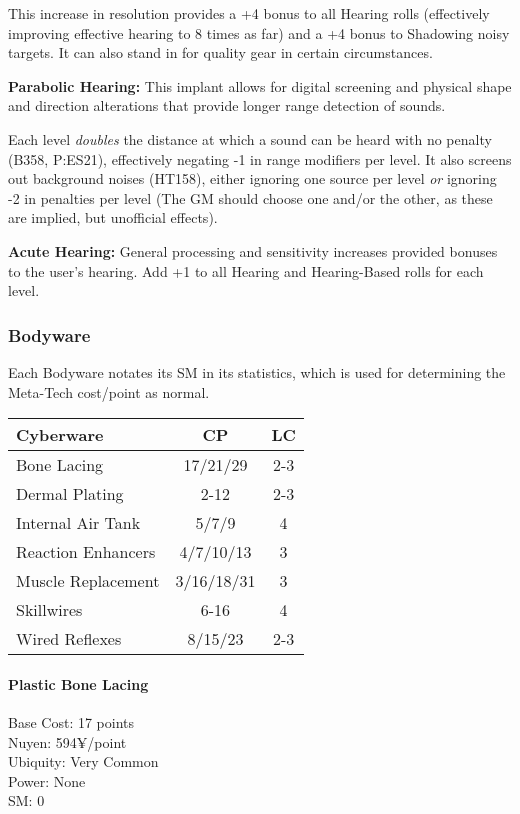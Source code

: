 \begin{multicols*}{3}
	This increase in resolution provides a +4 bonus to all Hearing rolls (effectively improving effective hearing to 8 times as far) and a +4 bonus to Shadowing noisy targets. It can also stand in for quality gear in certain circumstances.
	
	\textbf{Parabolic Hearing:} This implant allows for digital screening and physical shape and direction alterations that provide longer range detection of sounds.	
	
	Each level \textit{doubles} the distance at which a sound can be heard with no penalty (B358, P:ES21), effectively negating -1 in range modifiers per level. It also screens out background noises (HT158), either ignoring one source per level \textit{or} ignoring -2 in penalties per level (The GM should choose one and/or the other, as these are implied, but unofficial effects).
	
	\textbf{Acute Hearing:} General processing and sensitivity increases provided bonuses to the user's hearing. Add +1 to all Hearing and Hearing-Based rolls for each level.
	
	\subsubsection{Bodyware}
	
	Each Bodyware notates its SM in its statistics, which is used for determining the Meta-Tech cost/point as normal. 
	
	\begin{center}
		\begin{tabularx}{0.32\textwidth}{|X|c|c|}
			\hline
			Cyberware & CP & LC\\
			\hline
			\hline
			Bone Lacing & 17/21/29 & 2-3 \\
			Dermal Plating & 2-12 & 2-3 \\
			Internal Air Tank & 5/7/9 & 4 \\
			Reaction Enhancers & 4/7/10/13 & 3 \\
			Muscle Replacement & 3/16/18/31 & 3 \\
			Skillwires & 6-16 & 4 \\
			Wired Reflexes & 8/15/23 & 2-3 \\
			\hline
		\end{tabularx}
	\end{center}
		
	\paragraph{Plastic Bone Lacing}
	\begin{flushright}
		Base Cost: 17 points\\
		Nuyen: 594¥/point\\
		Ubiquity: Very Common\\
		Power: None\\
		SM: 0
	\end{flushright}
	

\end{multicols*}
